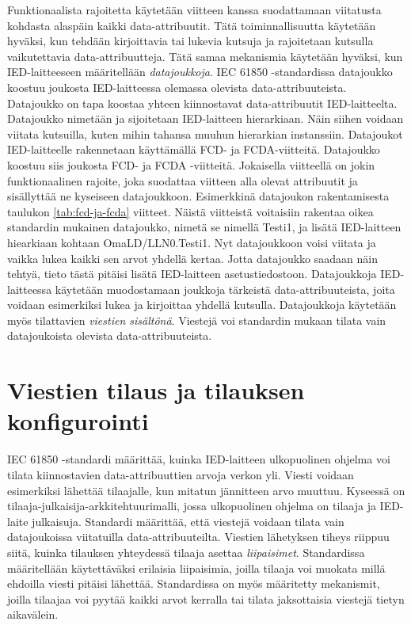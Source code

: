 Funktionaalista rajoitetta käytetään viitteen kanssa suodattamaan viitatusta kohdasta alaspäin kaikki data-attribuutit. Tätä toiminnallisuutta käytetään hyväksi, kun tehdään kirjoittavia tai lukevia kutsuja ja rajoitetaan kutsulla vaikutettavia data-attribuutteja. Tätä samaa mekanismia käytetään hyväksi, kun IED-laitteeseen määritellään \emph{datajoukkoja}. IEC 61850 -standardissa datajoukko koostuu joukosta IED-laitteessa olemassa olevista data-attribuuteista. Datajoukko on tapa koostaa yhteen kiinnostavat data-attribuutit IED-laitteelta. Datajoukko nimetään ja sijoitetaan IED-laitteen hierarkiaan. Näin siihen voidaan viitata kutsuilla, kuten mihin tahansa muuhun hierarkian instanssiin. Datajoukot IED-laitteelle rakennetaan käyttämällä FCD- ja FCDA-viitteitä. Datajoukko koostuu siis joukosta FCD- ja FCDA -viitteitä. Jokaisella viitteellä on jokin funktionaalinen rajoite, joka suodattaa viitteen alla olevat attribuutit ja sisällyttää ne kyseiseen datajoukkoon. Esimerkkinä datajoukon rakentamisesta taulukon \ref{tab:fcd-ja-fcda} viitteet. Näistä viitteistä voitaisiin rakentaa oikea standardin mukainen datajoukko, nimetä se nimellä Testi1, ja lisätä IED-laitteen hiearkiaan kohtaan OmaLD/LLN0.Testi1. Nyt datajoukkoon voisi viitata ja vaikka lukea kaikki sen arvot yhdellä kertaa. Jotta datajoukko saadaan näin tehtyä, tieto tästä pitäisi lisätä IED-laitteen asetustiedostoon. Datajoukkoja IED-laitteessa käytetään muodostamaan joukkoja tärkeistä data-attribuuteista, joita voidaan esimerkiksi lukea ja kirjoittaa yhdellä kutsulla. Datajoukkoja käytetään myös tilattavien \emph{viestien sisältönä}. Viestejä voi standardin mukaan tilata vain datajoukoista olevista data-attribuuteista. \mbox{\cite[s.~61--68]{IEC61850-7-2}}


\section{Viestien tilaus ja tilauksen konfigurointi}
\label{ch:viestien-tilaus-ja-tilauksen-konfigurointi}
IEC 61850 -standardi määrittää, kuinka IED-laitteen ulkopuolinen ohjelma voi tilata kiinnostavien data-attribuuttien arvoja verkon yli. Viesti voidaan esimerkiksi lähettää tilaajalle, kun mitatun jännitteen arvo muuttuu. Kyseessä on tilaaja-julkaisija-arkkitehtuurimalli, jossa ulkopuolinen ohjelma on tilaaja ja IED-laite julkaisuja. Standardi määrittää, että viestejä voidaan tilata vain datajoukoissa viitatuilla data-attribuuteilta. Viestien lähetyksen tiheys riippuu siitä, kuinka tilauksen yhteydessä tilaaja asettaa \emph{liipaisimet}. Standardissa määritellään käytettäväksi erilaisia liipaisimia, joilla tilaaja voi muokata millä ehdoilla viesti pitäisi lähettää. Standardissa on myös määritetty mekanismit, joilla tilaajaa voi pyytää kaikki arvot kerralla tai tilata jaksottaisia viestejä tietyn aikavälein. \mbox{\cite{IEC61850-7-1}}

